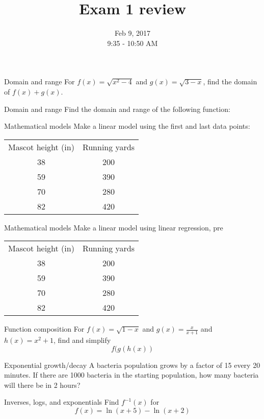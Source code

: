 \documentclass[t]{beamer}
\title{Exam 1 review}
\date{Feb 9, 2017 \\ 9:35 - 10:50 AM}
\begin{document}
\frame{\titlepage}

\begin{frame}{Domain and range}
For $f(x) = \sqrt{x^2 -4}$ and $g(x) = \sqrt{3-x}$, find the 
domain of $f(x) + g(x)$.
\end{frame}

\begin{frame}{Domain and range}
Find the domain and range of the following function:
\end{frame}

\begin{frame}{Mathematical models}
Make a linear model using the first and last data points:
\begin{table}
\begin{tabular}{c c}
Mascot height (in) & Running yards \\
38 & 200 \\
59 & 390 \\
70 & 280 \\
82 & 420
\end{tabular}
\end{table}
\end{frame}

\begin{frame}{Mathematical models}
Make a linear model using linear regression, pre
\begin{table}
\begin{tabular}{c c}
Mascot height (in) & Running yards \\
38 & 200 \\
59 & 390 \\
70 & 280 \\
82 & 420
\end{tabular}
\end{table}
\end{frame}

\begin{frame}{Function composition}
For $f(x) = \sqrt{1 - x}$ and $g(x) = \frac{x}{x+1}$ and
$h(x) = x^2 +1$, find and simplify
$$f(g(h(x))$$
\end{frame}

\begin{frame}{Exponential growth/decay}
A bacteria population grows by a factor of 15 every
20 minutes. If there are 1000 bacteria in the starting
population, how many bacteria will there be in 2
hours?
\end{frame}

\begin{frame}{Inverses, logs, and exponentials}
Find $f^{-1}(x)$ for
$$f(x) = \ln(x+5) - \ln(x+2)$$
\end{frame}
\end{document}
